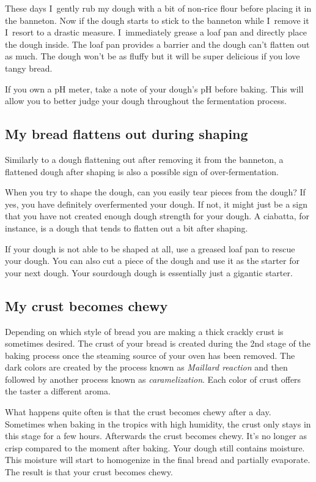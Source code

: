 These days I~gently rub my
dough with a bit of non-rice flour before placing it in
the banneton. Now if the dough starts to stick to the banneton
while I~remove it I~resort to a drastic measure. I~immediately
grease a loaf pan and directly place the dough inside. The loaf
pan provides a barrier and the dough can't flatten out as much.
The dough won't be as fluffy but it will be super delicious if you love tangy bread.

If you own a pH meter, take a note of your dough's pH before baking.
This will allow you to better judge your dough throughout
the fermentation process.

\subsection{My bread flattens out during shaping}

Similarly to a dough flattening out after removing it from the banneton,
a flattened dough after shaping is also a possible sign of over-fermentation.

When you try to shape the dough, can you easily tear pieces from the dough?
If yes, you have definitely overfermented your dough. If not, it might just
be a sign that you have not created enough dough strength for your dough.
A ciabatta, for instance, is a dough that tends to flatten out a bit after shaping.

If your dough is not able to be shaped at all, use a greased loaf pan
to rescue your dough. You can also cut a piece of the dough and use it
as the starter for your next dough. Your sourdough dough is essentially
just a gigantic starter.

\subsection{My crust becomes chewy}

Depending on which style of bread you are making a
thick crackly crust is sometimes desired. The crust
of your bread is created during the 2nd stage of the
baking process once the steaming source of your
oven has been removed. The dark colors are created by
the process known as \emph{Maillard reaction} and then followed
by another process known as \emph{caramelization}. Each
color of crust offers the taster a different aroma.

What happens quite often is that the crust becomes chewy after a day.
Sometimes when baking in the tropics with high humidity, the
crust only stays in this stage for a few hours. Afterwards
the crust becomes chewy. It's no longer as crisp compared
to the moment after baking. Your dough still contains moisture.
This moisture will start to homogenize in the final bread and
partially evaporate. The result is that your crust becomes chewy.

